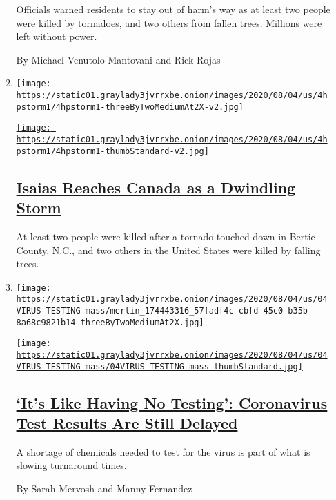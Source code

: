 \begin{enumerate}
\begin{enumerate}
    Officials warned residents to stay out of harm's way as at least two
    people were killed by tornadoes, and two others from fallen trees.
    Millions were left without power.

    By Michael Venutolo-Mantovani and Rick Rojas
  \item
    \texttt{[image: https://static01.graylady3jvrrxbe.onion/images/2020/08/04/us/4hpstorm1/4hpstorm1-threeByTwoMediumAt2X-v2.jpg]}

    \href{/2020/08/04/us/isaias-storm-updates.html}{\texttt{[image: https://static01.graylady3jvrrxbe.onion/images/2020/08/04/us/4hpstorm1/4hpstorm1-thumbStandard-v2.jpg]}}

    \hypertarget{isaias-reaches-canada-as-a-dwindling-storm}{%
    \subsection{\texorpdfstring{\href{/2020/08/04/us/isaias-storm-updates.html}{Isaias
    Reaches Canada as a Dwindling
    Storm}}{Isaias Reaches Canada as a Dwindling Storm}}\label{isaias-reaches-canada-as-a-dwindling-storm}}

    At least two people were killed after a tornado touched down in
    Bertie County, N.C., and two others in the United States were killed
    by falling trees.
  \item
    \texttt{[image: https://static01.graylady3jvrrxbe.onion/images/2020/08/04/us/04VIRUS-TESTING-mass/merlin\_174443316\_57fadf4c-cbfd-45c0-b35b-8a68c9821b14-threeByTwoMediumAt2X.jpg]}

    \href{/2020/08/04/us/virus-testing-delays.html}{\texttt{[image: https://static01.graylady3jvrrxbe.onion/images/2020/08/04/us/04VIRUS-TESTING-mass/04VIRUS-TESTING-mass-thumbStandard.jpg]}}

    \hypertarget{its-like-having-no-testing-coronavirus-test-results-are-still-delayed}{%
    \subsection{\texorpdfstring{\href{/2020/08/04/us/virus-testing-delays.html}{`It's
    Like Having No Testing': Coronavirus Test Results Are Still
    Delayed}}{`It's Like Having No Testing': Coronavirus Test Results Are Still Delayed}}\label{its-like-having-no-testing-coronavirus-test-results-are-still-delayed}}

    A shortage of chemicals needed to test for the virus is part of what
    is slowing turnaround times.

    By Sarah Mervosh and Manny Fernandez
  \end{enumerate}
\end{enumerate}

